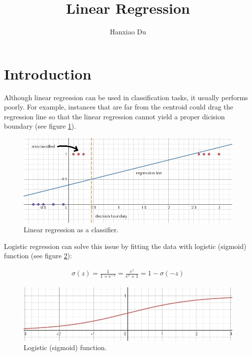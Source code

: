 \documentclass[12pt,a4paper]{article}
\title{Linear Regression}
\author{Hanxiao Du}
\date{}
\begin{document}
\maketitle
\tableofcontents

\section{Introduction}

Although linear regression can be used in classification tasks, it
usually performs poorly. For example, instances that are far from the
centroid could drag the regression line so that the linear regression
cannot yield a proper dicision boundary (see figure \ref{linear_reg}).

\begin{figure}[h]
\centering
\includegraphics[scale=0.7]{assets/figures/linear_reg.png}
\caption{Linear regression as a classifier.\label{linear_reg}}
\end{figure}

Logistic regression can solve this issue by fitting the data with
logistic (sigmoid) function (see figure \ref{sigmoid}):

\begin{align}\label{sigmoid_func}
\sigma(z)=\frac{1}{1+e^{-z}} = \frac{e^z}{e^{z}+1} = 1-\sigma(-z)
\end{align}

\begin{figure}[h]
\centering
\includegraphics[scale=0.7]{assets/figures/sigmoid.png}
\caption{Logistic (sigmoid) function.\label{sigmoid}}
\end{figure}
\end{document}
